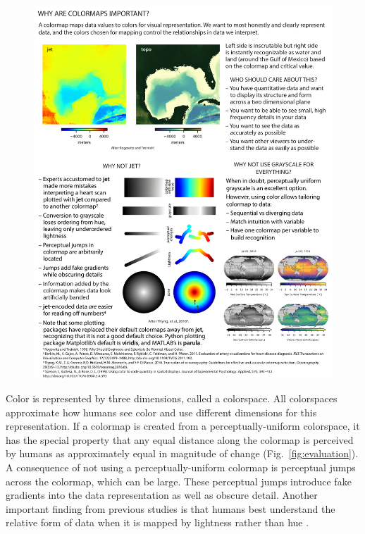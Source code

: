 \documentclass[10pt,journal,compsoc]{IEEEtran}
\begin{document}
\begin{figure}
	\includegraphics[width=\textwidth]{figures/motivation.pdf}
	\caption{}
	\label{fig:motivation}
\end{figure}

\nocite{treinish1998should}
\nocite{borkin2011evaluation}
\nocite{thyng2016true}
\nocite{Spence:1999ea}



Color is represented by three dimensions, called a colorspace. All colorspaces approximate how humans see color and use different dimensions for this representation. If a colormap is created from a perceptually-uniform colorspace, it has the special property that any equal distance along the colormap is perceived by humans as approximately equal in magnitude of change (Fig.~\ref{fig:evaluation}). A consequence of not using a perceptually-uniform colormap is perceptual jumps across the colormap, which can be large. These perceptual jumps introduce fake gradients into the data representation as well as obscure detail. Another important finding from previous studies is that humans best understand the relative form of data when it is mapped by lightness rather than hue \citep{kovesi2015good}.
\end{document}
